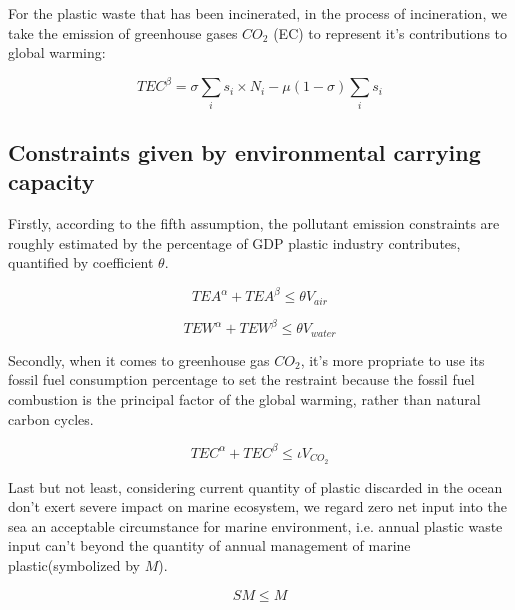 \documentclass{mcmthesis}
\begin{document}
For the plastic waste that has been incinerated, in the process of incineration, we take the emission of greenhouse gases $CO_2$ (EC) to represent it’s contributions to global warming:

\begin{equation}
TEC^\beta = \sigma\sum_{i}s_i\times N_i - \mu(1 - \sigma)\sum_is_i
\end{equation}

\subsection{Constraints given by environmental carrying capacity}

Firstly, according to the fifth assumption, the pollutant emission constraints are roughly estimated by the percentage of GDP plastic industry contributes, quantified by coefficient $\theta$.

\begin{equation}
TEA^\alpha + TEA^\beta \le \theta V_{air}
\label{air}
\end{equation}

\begin{equation}
TEW^\alpha + TEW^\beta \le \theta V_{water}
\label{water}
\end{equation}


Secondly, when it comes to greenhouse gas $CO_2$, it’s more propriate to use its fossil fuel consumption percentage to set the restraint because the fossil fuel combustion is the principal factor of the global warming, rather than natural carbon cycles\cite{book}.

\begin{equation}
TEC^\alpha + TEC^\beta \le \iota V_{CO_2}
\label{ECO}
\end{equation}


Last but not least, considering current quantity of plastic discarded in the ocean don’t exert severe impact on marine ecosystem, we regard zero net input into the sea an acceptable circumstance for marine environment, i.e. annual plastic waste input can’t beyond the quantity of annual management of marine plastic(symbolized by $M$).

\begin{equation}
SM \le M
\end{equation}
\end{document}
